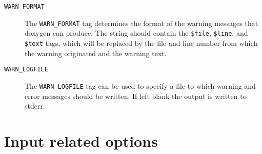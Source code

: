 \begin{description}
\label{config_cfg_warn_format}
\hypertarget{config_cfg_warn_format}{}
 \item[{\tt WARN\_\-FORMAT} ] The {\tt WARN\_\-FORMAT} tag determines the format of the warning messages that doxygen can produce. The string should contain the {\tt \$file}, {\tt \$line}, and {\tt \$text} tags, which will be replaced by the file and line number from which the warning originated and the warning text.

\label{config_cfg_warn_logfile}
\hypertarget{config_cfg_warn_logfile}{}
 \item[{\tt WARN\_\-LOGFILE} ] The {\tt WARN\_\-LOGFILE} tag can be used to specify a file to which warning and error messages should be written. If left blank the output is written to stderr.

\end{description}
\hypertarget{config_config_input}{}\section{Input related options}\label{config_config_input}
\label{config_cfg_input}
\hypertarget{config_cfg_input}{}
